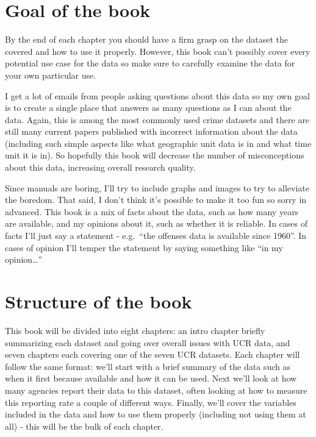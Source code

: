 \documentclass[
  12pt,
  openany]{book}
\begin{document}
\hypertarget{goal-of-the-book}{%
\section{Goal of the book}\label{goal-of-the-book}}

By the end of each chapter you should have a firm grasp on the dataset the covered and how to use it properly. However, this book can't possibly cover every potential use case for the data so make sure to carefully examine the data for your own particular use.

I get a lot of emails from people asking questions about this data so my own goal is to create a single place that answers as many questions as I can about the data. Again, this is among the most commonly used crime datasets and there are still many current papers published with incorrect information about the data (including such simple aspects like what geographic unit data is in and what time unit it is in). So hopefully this book will decrease the number of misconceptions about this data, increasing overall research quality.

Since manuals are boring, I'll try to include graphs and images to try to alleviate the boredom. That said, I don't think it's possible to make it too fun so sorry in advanced. This book is a mix of facts about the data, such as how many years are available, and my opinions about it, such as whether it is reliable. In cases of facts I'll just say a statement - e.g.~``the offenses data is available since 1960''. In cases of opinion I'll temper the statement by saying something like ``in my opinion\ldots{}''

\hypertarget{structure-of-the-book}{%
\section{Structure of the book}\label{structure-of-the-book}}

This book will be divided into eight chapters: an intro chapter briefly summarizing each dataset and going over overall issues with UCR data, and seven chapters each covering one of the seven UCR datasets. Each chapter will follow the same format: we'll start with a brief summary of the data such as when it first because available and how it can be used. Next we'll look at how many agencies report their data to this dataset, often looking at how to measure this reporting rate a couple of different ways. Finally, we'll cover the variables included in the data and how to use them properly (including not using them at all) - this will be the bulk of each chapter.
\end{document}
